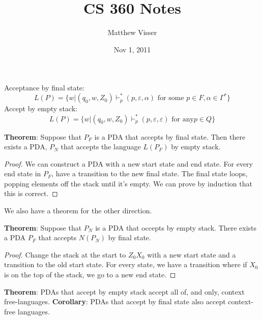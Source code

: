 \documentclass[12pt]{article}
\begin{document}
\title{CS 360 Notes}
\author{Matthew Visser}
\date{Nov  1, 2011}
\maketitle

Acceptance by final state:
\begin{equation}
	L(P) = \{w|(q_0,w,Z_0)\vdash_p^* (p,\varepsilon,\alpha) \text{ for some } p
	\in F, \alpha \in \Gamma^* \}
	\label{acceptFinal}
\end{equation}
Accept by empty stack:
\begin{equation}
	L(P) = \{w|(q_0,w,Z_0)\vdash_p^* (p,\varepsilon,\varepsilon) \text{ for any} p
	\in Q\}
	\label{acceptEmpty}
\end{equation}

\textbf{Theorem}: Suppose that $P_F$ is a PDA that accepts by final state. Then
there exists a PDA, $P_N$ that accepts the language $L(P_F)$ by empty stack.

\begin{proof}
	We can construct a PDA with a new start state and end state. For every end
	state in $P_F$, have a transition to the new final state.  The final state
	loops, popping elements off the stack until it's empty. We can prove by
	induction that this is correct.
\end{proof}

We also have a theorem for the other direction.

\textbf{Theorem}: Suppose that $P_N$ is a PDA that occepts by empty stack. There
exists a PDA $P_F$ that accepts $N(P_N)$ by final state.

\begin{proof}
	Change the stack at the start to $Z_0X_0$ with a new start state and a
	transition to the old start state.  For every state, we have a transition
	where if $X_0$ is on the top of the stack, we go to a new end state.
\end{proof}

\textbf{Theorem}: PDAs that accept by empty stack accept all of, and only,
context free-languages.
\textbf{Corollary}: PDAs that accept by final state also accept context-free
languages.
\end{document}
